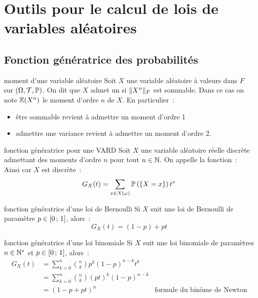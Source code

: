 \section{Outils pour le calcul de lois de variables aléatoires}

\subsection{Fonction génératrice des probabilités}

\begin{definition}{}{moment d'une variable aléatoire}
    Soit $X$ une variable aléatoire à valeurs dans $F$ sur $(\Omega, \mathcal{T}, \mathbb{P})$. On dit que $X$ admet un  si $\lVert X^n\rVert_F$ est sommable. Dans ce cas on note $\mathbb{E}(X^n)$ le moment d'ordre $n$ de $X$. En particulier~:
    \begin{itemize}
        \item être sommable revient à admettre un moment d'ordre 1
        \item admettre une variance revient à admettre un moment d'ordre 2.
    \end{itemize}    
\end{definition}

\begin{definition}{}{fonction génératrice pour une VARD}
    Soit $X$ une variable aléatoire réelle discrète admettant des moments d'ordre $n$ pour tout $n \in \mathbb{N}$. On appelle  la fonction~:
    Ainsi car $X$ est discrète~:
    $$G_X(t) = \sum_{x \in X(\omega)} \mathbb{P}\left(\left\{X=x\right\}\right) t^x$$
\end{definition}

\begin{exemple}{}{fonction génératrice d'une loi de Bernoulli}
    Si $X$ suit une loi de Bernoulli de paramètre $p \in [0\, ; \, 1]$, alors~:
    $$G_X(t) = (1-p) + pt$$
\end{exemple}

\begin{exemple}{}{fonction génératrice d'une loi binomiale}
    Si $X$ suit une loi binomiale de paramètres $n \in \mathbb{N}^*$ et $p \in [0\, ; \, 1]$, alors~:
    \begin{align*}
        G_X(t) &= \sum_{k=0}^n \binom{n}{k} p^k (1-p)^{n-k} t^k \\
        &= \sum_{k=0}^n \binom{n}{k} (pt)^k (1-p)^{n-k} \\
        &= (1-p + pt)^n \qquad &\text{formule du binôme de Newton}
    \end{align*}
\end{exemple}

